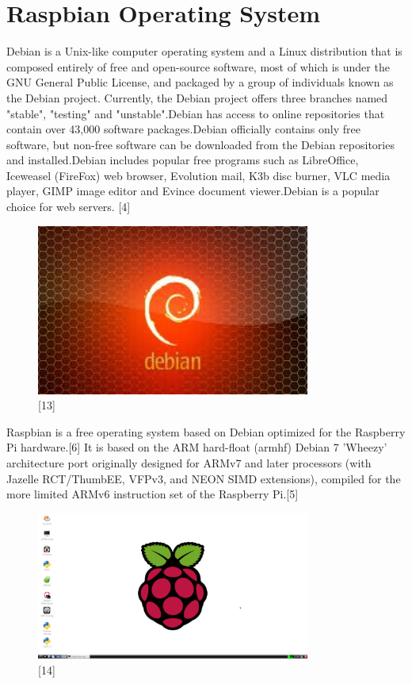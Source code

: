 \documentclass[11pt,a4paper]{article}
\begin{document}
	\section{Raspbian Operating System}
	Debian is a Unix-like computer operating system and a Linux distribution that is composed entirely of free and open-source software, most of which is under the GNU General Public License, and packaged by a group of individuals known as the Debian project. Currently, the Debian project offers three branches named "stable", "testing" and "unstable".Debian has access to online repositories that contain over 43,000 software packages.Debian officially contains only free software, but non-free software can be downloaded from the Debian repositories and installed.Debian includes popular free programs such as LibreOffice, Iceweasel (FireFox) web browser, Evolution mail, K3b disc burner, VLC media player, GIMP image editor and Evince document viewer.Debian is a popular choice for web servers. [4]
		\begin{figure}[h!]
			\includegraphics[width=9cm]{d.jpg}
			\centering
			\caption{[13]}
		\end{figure} 
	
	\newpage	
	Raspbian is a free operating system based on Debian optimized for the Raspberry Pi hardware.[6] It is based on the ARM hard-float (armhf) Debian 7 'Wheezy' architecture port originally designed for ARMv7 and later processors (with Jazelle RCT/ThumbEE, VFPv3, and NEON SIMD extensions), compiled for the more limited ARMv6 instruction set of the Raspberry Pi.[5]
	\begin{figure}[h!]
		\includegraphics[width=9cm]{ras.jpg}
		\centering
		\caption{[14]}
	\end{figure} 
	 
\end{document}
